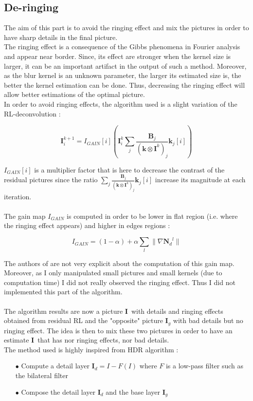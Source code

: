 \documentclass{article}
\newcommand{\I}{\textbf{I}}
\newcommand{\B}{\textbf{B}}
\newcommand{\Nd}{\textbf{N$_d$}}
\newcommand{\kernel}{\textbf{k}}
\begin{document}
\subsection{De-ringing}

The aim of this part is to avoid the ringing effect and mix the pictures in order to have sharp details in the final picture.\\
The ringing effect is a consequence of the Gibbs phenomena in Fourier analysis and appear near border. Since, its effect are stronger when the kernel size is larger, it can be an important artifact in the output of such a method. Moreover, as the blur kernel is an unknown parameter, the larger its estimated size is, the better the kernel estimation can be done. Thus, decreasing the ringing effect will allow better estimations of the optimal picture.\\
In order to avoid ringing effects, the algorithm used is a slight variation of the RL-deconvolution :

\[
	\I^{k+1} _i= I_{GAIN}[i](\I^k_i \sum_{j}\frac{\B_j}{(\kernel \otimes \I^k)_j} \kernel_j[i])
\]

$I_{GAIN}[i]$ is a multiplier factor that is here to decrease the contrast of the residual pictures since the ratio $\sum_{j}\frac{\B_j}{(\kernel \otimes \I^k)_j} \kernel_j[i]$ increase its magnitude at each iteration.\\
\\
The gain map $I_{GAIN}$ is computed in order to be lower in flat region (i.e. where the ringing effect appears) and higher in edges regions :

\[
	I_{GAIN} = 	(1 - \alpha) + \alpha \sum_l \| \nabla \Nd^l \|
\]

The authors of \cite{deblur_denoise} are not very explicit about the computation of this gain map. Moreover, as I only manipulated small pictures and small kernels (due to computation time) I did not really observed the ringing effect. Thus I did not implemented this part of the algorithm.\\
\\
The algorithm results are now a picture \I\ with details and ringing effects obtained from residual RL and the "opposite" picture $\I_g$ with bad details but no ringing effect. The idea is then to mix these two pictures in order to have an estimate \I\ that has nor ringing effects, nor bad details.\\
The method used is highly inspired from HDR algorithm :

\begin{itemize}
	\item[$\bullet$] Compute a detail layer $\I_d = I - F(I)$ where $F$ is a low-pass filter such as the bilateral filter
	\item[$\bullet$] Compose the detail layer $\I_d$ and the base layer $\I_g$
\end{itemize}
\end{document}
